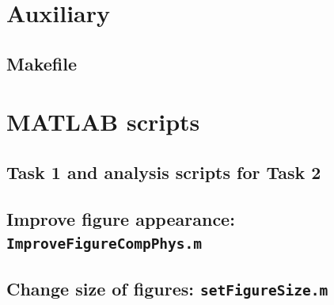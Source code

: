\section{Auxiliary }
\subsection{Makefile}


\section{MATLAB scripts}
\subsection{Task 1 and analysis scripts for Task 2}


\subsection{Improve figure appearance: \texttt{ImproveFigureCompPhys.m}}


\subsection{Change size of figures: \texttt{setFigureSize.m}}




